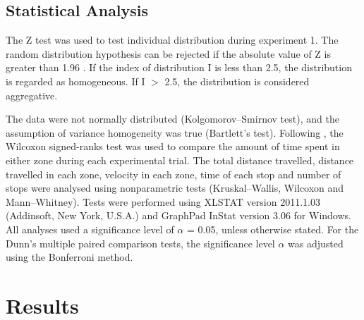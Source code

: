 
\subsection{Statistical Analysis}
The Z test was used to test individual distribution during experiment 1. The random distribution hypothesis can be rejected if the absolute value of Z is greater than 1.96 \cite{canard_quelques_2004}. If the index of distribution I is less than 2.5, the distribution is regarded as homogeneous. If I $>$ 2.5, the distribution is considered aggregative.

The data were not normally distributed (Kolgomorov–Smirnov test), and the assumption of variance homogeneity was true (Bartlett's test). Following \citet{zar_biostatistical_2010}, the Wilcoxon signed-ranks test was used to compare the amount of time spent in either zone during each experimental trial. The total distance travelled, distance travelled in each zone, velocity in each zone, time of each stop and number of stops were analysed using nonparametric tests (Kruskal–Wallis, Wilcoxon and Mann–Whitney). Tests were performed using XLSTAT version 2011.1.03 (Addinsoft, New York, U.S.A.) and GraphPad InStat version 3.06 for Windows. All analyses used a significance level of $\alpha$ = 0.05, unless otherwise stated. For the Dunn's multiple paired comparison tests, the significance level $\alpha$ was adjusted using the Bonferroni method.



\section{Results}


